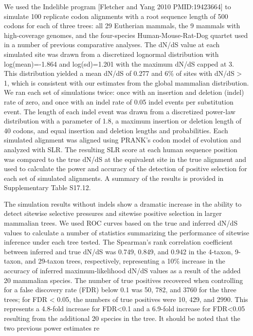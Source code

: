 We used the Indelible program [Fletcher and Yang 2010 PMID:19423664]
to simulate 100 replicate codon alignments with a root sequence length
of 500 codons for each of three trees: all 29 Eutherian mammals, the 9
mammals with high-coverage genomes, and the four-species
Human-Mouse-Rat-Dog quartet used in a number of previous comparative
analyses. The dN/dS value at each simulated site was drawn from a
discretized lognormal distribution with log(mean)=-1.864 and
log(sd)=1.201 with the maximum dN/dS capped at 3. This distribution
yielded a mean dN/dS of 0.277 and 6\% of sites with dN/dS > 1, which
is consistent with our estimates from the global mammalian
distribution. We ran each set of simulations twice: once with an
insertion and deletion (indel) rate of zero, and once with an indel
rate of 0.05 indel events per substitution event. The length of each
indel event was drawn from a discretized power-law distribution with a
parameter of 1.8, a maximum insertion or deletion length of 40 codons,
and equal insertion and deletion lengths and probabilities. Each
simulated alignment was aligned using PRANK’s codon model of evolution
and analyzed with SLR. The resulting SLR score at each human sequence
position was compared to the true dN/dS at the equivalent site in the
true alignment and used to calculate the power and accuracy of the
detection of positive selection for each set of simulated
alignments. A summary of the results is provided in Supplementary
Table S17.12.

The simulation results without indels show a dramatic increase in the
ability to detect sitewise selective pressures and sitewise positive
selection in larger mammalian trees. We used ROC curves based on the
true and inferred dN/dS values to calculate a number of statistics
summarizing the performance of sitewise inference under each tree
tested. The Spearman’s rank correlation coefficient between inferred
and true dN/dS was 0.749, 0.849, and 0.942 in the 4-taxon, 9-taxon,
and 29-taxon trees, respectively, representing a 10\% increase in the
accuracy of inferred maximum-likelihood dN/dS values as a result of
the added 20 mammalian species. The number of true positives recovered
when controlling for a false discovery rate (FDR) below 0.1 was 50,
782, and 3760 for the three trees; for FDR < 0.05, the numbers of true
positives were 10, 429, and 2990. This represents a 4.8-fold increase
for FDR<0.1 and a 6.9-fold increase for FDR<0.05 resulting from the
additional 20 species in the tree. It should be noted that the two
previous power estimates re

